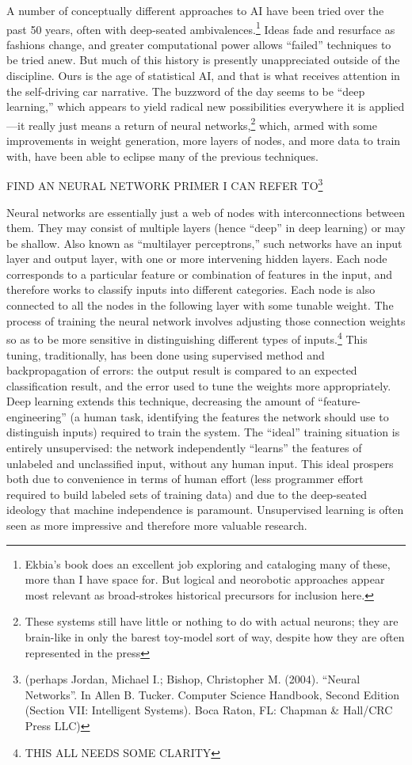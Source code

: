 A number of conceptually different approaches to AI have been tried
over the past 50 years, often with deep-seated
ambivalences.\footnote{Ekbia's book does an excellent job
  exploring and cataloging many of these, more than I have space for.
  But logical and neorobotic approaches appear most relevant as
  broad-strokes historical precursors for inclusion here.} Ideas fade
and resurface as fashions change, and greater computational power
allows ``failed'' techniques to be tried anew. But much of this
history is presently unappreciated outside of the discipline. Ours is the age of
statistical AI, and that is what receives attention in the
self-driving car narrative. The buzzword of the day seems to be ``deep learning,'' which
appears to yield radical new possibilities everywhere it is
applied---it really just means a return of neural
networks,\footnote{These systems still have little or nothing to do
  with actual neurons; they are brain-like in only the barest
  toy-model sort of way, despite how they are often represented in the
  press} which, armed with some improvements in weight generation, more layers of
nodes, and more data to train with, have been able to eclipse many of
the previous techniques\cite{???}.

FIND AN NEURAL NETWORK PRIMER I CAN REFER TO\footnote{
(perhaps Jordan, Michael I.; Bishop, Christopher M. (2004). ``Neural
Networks''. In Allen B. Tucker. Computer Science Handbook, Second
Edition (Section VII: Intelligent Systems). Boca Raton, FL: Chapman \&
Hall/CRC Press LLC)}

Neural networks are essentially just a web of nodes with
interconnections between them. They may consist of multiple layers
(hence ``deep'' in deep learning) or may be shallow. Also known as
``multilayer perceptrons,'' such networks have an input layer and
output layer, with one or more intervening hidden layers. Each node
corresponds to a particular feature or combination of features in the
input, and therefore works to classify inputs into different
categories. Each node is also connected to all the nodes in the
following layer with some tunable weight. The process of training the
neural network involves adjusting those connection weights so as to
be more sensitive in distinguishing different types of
inputs.\footnote{THIS ALL NEEDS SOME CLARITY} This tuning,
traditionally, has been done using supervised method and
backpropagation of errors: the output result is compared to an
expected classification result, and the error used to tune the weights
more appropriately. Deep learning extends this technique, decreasing
the amount of ``feature-engineering'' (a human task, identifying the
features the network should use to distinguish inputs) required to
train the system. The ``ideal'' training situation is entirely
unsupervised: the network independently ``learns'' the features of
unlabeled and unclassified input, without any human input. This ideal
prospers both due to convenience in terms of human effort (less
programmer effort required to build labeled sets of training data) and
due to the deep-seated ideology that machine independence is
paramount. Unsupervised learning is often seen as more impressive and
therefore more valuable research.\cite{???}



